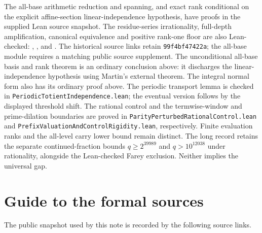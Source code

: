 \documentclass[11pt]{article}
\renewcommand{\commitshort}{99f4bf47422a}
\begin{document}
The all-base arithmetic reduction and spanning, and exact rank conditional on
the explicit affine-section linear-independence hypothesis, have proofs in the
supplied Lean source snapshot.  The residue-series irrationality, full-depth
amplification, canonical equivalence and positive rank-one floor are also
Lean-checked:
,
, and
.
The historical source links retain \texttt{\commitshort}; the all-base
module requires a matching public source supplement.  The unconditional
all-base basis and rank theorem is an ordinary conclusion above: it discharges
the linear-independence hypothesis using Martin's external theorem.  The
integral normal form also has its ordinary proof above. The periodic transport
lemma is checked in \texttt{PeriodicTotientIndependence.lean}; the eventual
version follows by the displayed threshold shift. The rational control and
the termwise-window and prime-dilation boundaries are proved in
\texttt{ParityPerturbedRationalControl.lean} and
\texttt{PrefixValuationAndControlRigidity.lean}, respectively.
Finite evaluation ranks and the all-level carry lower bound remain distinct.
The long record retains the separate continued-fraction bounds
$q\ge2^{39989}$ and $q>10^{12038}$ under rationality, alongside the
Lean-checked Farey exclusion. Neither implies the universal gap.
\appendix
\section{Guide to the formal sources}\label{app:sources}

The public snapshot used by this note is recorded by the following source links.
\end{document}
